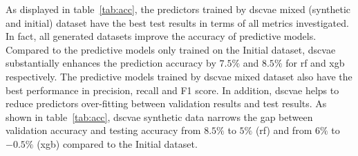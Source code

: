\documentclass[twoside,twocolumn,9pt]{article}
\begin{document}
As displayed in table~\ref{tab:acc}, the predictors trained by \acrshort*{dscvae} mixed (synthetic and initial) dataset have the best test results in terms of all metrics investigated. In fact, all generated datasets improve the accuracy of predictive models. Compared to the predictive models only trained on the Initial dataset, \acrshort*{dscvae} substantially enhances the prediction accuracy by $7.5\%$ and $8.5\%$ for \acrshort*{rf} and \acrlong*{xgb} respectively. The predictive models trained by \acrshort*{dscvae} mixed dataset also have the best performance in precision, recall and F1 score. In addition, \acrshort*{dscvae} helps to reduce predictors over-fitting between validation results and test results. As shown in table~\ref{tab:acc}, \acrshort*{dscvae} synthetic data narrows the gap between validation accuracy and testing accuracy from $8.5\%$ to $5\%$ (\acrshort*{rf}) and from $6\%$ to $-0.5\%$ (\acrlong*{xgb}) compared to the Initial dataset. 

\begin{table}[!htb]
\centering
\caption{Confusion matrices for RF and XGBoost. Here, `TP' and `TN', and `FP' and `FN' correspond to true positive and true negative predictions, and false positive and false negative predictions, respectively, where ``positive" and ``negative", in turn, correspond to coalescence and non-coalescence events, respectively.}
\label{tab:cm}
\end{table}
\end{document}
